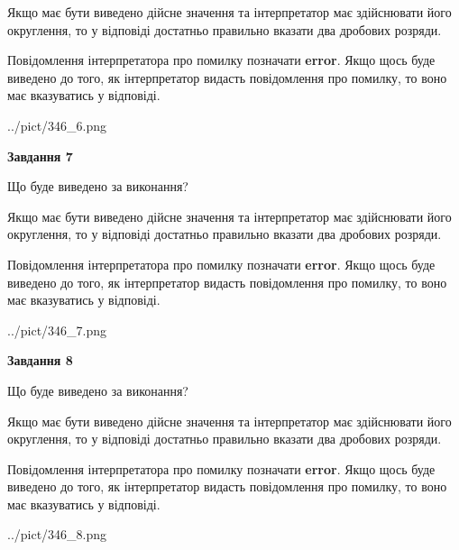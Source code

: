 \documentclass[12pt, ukrainian]{article}
\begin{document}
{\begin {Large}
Якщо має бути виведено дійсне значення та інтерпретатор має здійснювати його округлення, 
то у відповіді достатньо правильно вказати два дробових розряди.

Повідомлення інтерпретатора про помилку позначати \textbf{error}.
Якщо щось буде виведено до того, як інтерпретатор видасть повідомлення про помилку, 
то воно має вказуватись у відповіді. \par

\begin{center}
	{../pict/346_6.png}
\end{center}
\newpage

{\begin {center}\textbf{Завдання 7}\end {center}}\par
Що буде виведено за виконання? \par

Якщо має бути виведено дійсне значення та інтерпретатор має здійснювати його округлення, 
то у відповіді достатньо правильно вказати два дробових розряди.

Повідомлення інтерпретатора про помилку позначати \textbf{error}.
Якщо щось буде виведено до того, як інтерпретатор видасть повідомлення про помилку, 
то воно має вказуватись у відповіді. \par

\begin{center}
	{../pict/346_7.png}
\end{center}
\newpage

{\begin {center}\textbf{Завдання 8}\end {center}}\par
Що буде виведено за виконання? \par

Якщо має бути виведено дійсне значення та інтерпретатор має здійснювати його округлення, 
то у відповіді достатньо правильно вказати два дробових розряди.

Повідомлення інтерпретатора про помилку позначати \textbf{error}.
Якщо щось буде виведено до того, як інтерпретатор видасть повідомлення про помилку, 
то воно має вказуватись у відповіді. \par

\begin{center}
	{../pict/346_8.png}
\end{center}
\newpage


\end{Large}}
\end{document}
